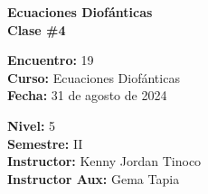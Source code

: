 \begin{center} \textbf
{
    \Large Ecuaciones Diofánticas \\ \vspace{2mm}Clase \#4
}
\end{center}

\begin{multicols}{2}
{
    \textbf{Encuentro:} 19\\
    \textbf{Curso:} Ecuaciones Diofánticas\\
    \textbf{Fecha:} 31 de agosto de 2024\\
    \begin{flushright}
        \textbf{Nivel:} 5\\
        \textbf{Semestre:} II\\
        \textbf{Instructor:} Kenny Jordan Tinoco\\
        \textbf{Instructor Aux:} Gema Tapia
    \end{flushright}
}
\end{multicols}

\thispagestyle{first-page-style}